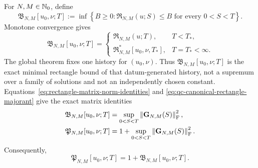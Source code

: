 \begin{definition}
\label{def:qc-canonical-majorants}
For \(N,M\in\mathbb N_0\), define
\begin{equation}
 \mathfrak B_{N,M}[u_0,\nu;T]
 :=\inf\left\{B\ge0:
 \mathfrak R_{N,M}(u;S)\le B
 \text{ for every }0<S<T\right\}.
 \label{eq:qc-canonical-rectangle-majorant}
\end{equation}
Monotone convergence gives
\begin{equation}
 \mathfrak B_{N,M}[u_0,\nu;T]
 =\begin{cases}
   \mathfrak R_{N,M}(u;T),&T<T_*,\\
   \mathfrak R_{N,M}^*[u_0,\nu,T_*],&T=T_*<\infty.
  \end{cases}
 \label{eq:qc-canonical-rectangle-identification}
\end{equation}
The global theorem fixes one history for \((u_0,\nu)\).  Thus
\(\mathfrak B_{N,M}[u_0,\nu;T]\) is the exact minimal rectangle bound of
that datum-generated history, not a supremum over a family of solutions and
not an independently chosen constant.
Equations~\eqref{eq:rectangle-matrix-norm-identities} and
\eqref{eq:qc-canonical-rectangle-majorant} give the exact matrix identities
\begin{align}
 \mathfrak B_{N,M}[u_0,\nu;T]
 &=\sup_{0<S<T}\left\lVert \mathbf G_{N,M}(S)\right\rVert_{\mathrm F}^2,
 \label{eq:qc-B-matrix-identity}\\
 \mathfrak P_{N,M}[u_0,\nu;T]
 &=1+\sup_{0<S<T}\left\lVert \mathbf G_{N,M}(S)\right\rVert_{\mathrm F}^2.
 \label{eq:qc-P-matrix-identity}
\end{align}
Consequently,
\begin{equation}
 \mathfrak P_{N,M}[u_0,\nu;T]
 =1+\mathfrak B_{N,M}[u_0,\nu;T].
 \label{eq:qc-producer-through-B}
\end{equation}


\end{definition}
